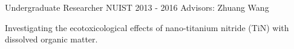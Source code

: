 \begin{cventries}
  \cventry
    {Undergraduate Researcher} %
    {NUIST} %
    {2013 - 2016} %
    {Advisors: Zhuang Wang} %
    {
      \begin{cvitems} %
        \item {Investigating the ecotoxicological effects of nano-titanium nitride (TiN) with dissolved organic matter.}
      \end{cvitems}
    }

\end{cventries}
